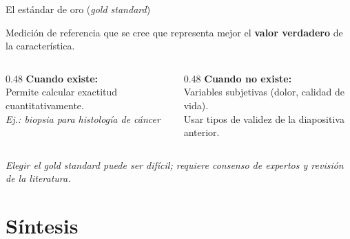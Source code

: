 \documentclass[aspectratio=169, 12pt, xcolor=table]{beamer}
\begin{document}
\begin{frame}{El estándar de oro (\textit{gold standard})}
  \begin{definicion}
    Medición de referencia que se cree que representa mejor
    el \textbf{valor verdadero} de la característica.
  \end{definicion}

  \vspace{4pt}
  {\small
  \begin{columns}[T]
    \begin{column}{0.48\textwidth}
      \textbf{Cuando existe:}\\[2pt]
      Permite calcular exactitud cuantitativamente.\\[2pt]
      \textit{Ej.: biopsia para histología de cáncer}
    \end{column}
    \begin{column}{0.48\textwidth}
      \textbf{Cuando no existe:}\\[2pt]
      Variables subjetivas (dolor, calidad de vida).\\[2pt]
      Usar tipos de validez de la diapositiva anterior.
    \end{column}
  \end{columns}
  }

  \vspace{4pt}
  {\footnotesize\color{textdark!70}\itshape
    Elegir el \textit{gold standard} puede ser difícil; requiere consenso
    de expertos y revisión de la literatura.}
\end{frame}

\section{Síntesis}
\end{document}
